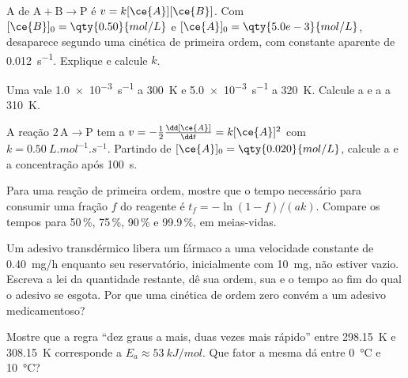 \begin{exercise}[$\star\star$]\label{exo:b1:rate-laws:7}
A  de $\mathrm{A} + \mathrm{B} \longrightarrow \mathrm{P}$ é $v = k[\ce{A}][\ce{B}]$. Com
$[\ce{B}]_0 = \qty{0.50}{mol/L}$ e $[\ce{A}]_0 = \qty{5.0e-3}{mol/L}$,
 desaparece segundo uma cinética de primeira ordem, com constante
aparente de \qty{0.012}{s^{-1}}. Explique e calcule $k$.
\end{exercise}

\begin{exercise}[$\star\star$]\label{exo:b1:rate-laws:8}
Uma  vale \qty{1.0e-3}{s^{-1}} a \qty{300}{K} e
\qty{5.0e-3}{s^{-1}} a \qty{320}{K}. Calcule a  e a
 a \qty{310}{K}.
\end{exercise}

\begin{exercise}[$\star\star$]\label{exo:b1:rate-laws:9}
A reação $2\,\mathrm{A} \longrightarrow \mathrm{P}$ tem a  $v = -\frac12\frac{\dd[\ce{A}]}
{\dd t} = k[\ce{A}]^2$ com $k = \qty{0.50}{L.mol^{-1}.s^{-1}}$. Partindo
de $[\ce{A}]_0 = \qty{0.020}{mol/L}$, calcule a  e a
concentração após \qty{100}{s}.
\end{exercise}

\begin{exercise}[$\star\star\star$]\label{exo:b1:rate-laws:10}
Para uma reação de primeira ordem, mostre que o tempo necessário para
consumir uma fração $f$ do reagente é $t_f = -\ln(1 - f)/(ak)$. Compare
os tempos para 50\,\%, 75\,\%, 90\,\% e 99.9\,\%, em meias-vidas.
\end{exercise}

\begin{exercise}[$\star\star\star$]\label{exo:b1:rate-laws:11}
Um adesivo transdérmico libera um fármaco a uma velocidade constante de
\qty{0.40}{mg/h} enquanto seu reservatório, inicialmente com
\qty{10}{mg}, não estiver vazio. Escreva a lei da quantidade restante,
dê sua ordem, sua  e o tempo ao fim do qual o adesivo se
esgota. Por que uma cinética de ordem zero convém a um adesivo
medicamentoso?
\end{exercise}

\begin{exercise}[$\star\star\star$]\label{exo:b1:rate-laws:12}
Mostre que a regra ``dez graus a mais, duas vezes mais rápido'' entre
\qty{298.15}{K} e \qty{308.15}{K} corresponde a $E_a \approx
\qty{53}{kJ/mol}$. Que fator a mesma  dá entre
\qty{0}{\celsius} e \qty{10}{\celsius}?
\end{exercise}

